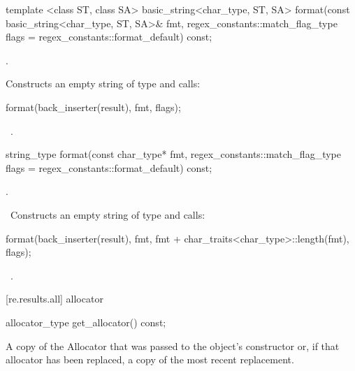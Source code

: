 %
\begin{itemdecl}
template <class ST, class SA>
  basic_string<char_type, ST, SA>
  format(const basic_string<char_type, ST, SA>& fmt,
         regex_constants::match_flag_type flags =
           regex_constants::format_default) const;
\end{itemdecl}

\begin{itemdescr}
\pnum
\requires {}.

\pnum
\effects
Constructs an empty string  of type  and
calls:
\begin{codeblock}
format(back_inserter(result), fmt, flags);
\end{codeblock}

\pnum
\returns\ .
\end{itemdescr}

%
\begin{itemdecl}
string_type
  format(const char_type* fmt,
         regex_constants::match_flag_type flags =
           regex_constants::format_default) const;
\end{itemdecl}

\begin{itemdescr}
\pnum
\requires {}.

\pnum
\effects\ Constructs an empty string  of type  and
calls:
\begin{codeblock}
format(back_inserter(result),
       fmt, fmt + char_traits<char_type>::length(fmt), flags);
\end{codeblock}

\pnum
\returns\ .
\end{itemdescr}

[re.results.all]{ allocator}%

%
\begin{itemdecl}
allocator_type get_allocator() const;
\end{itemdecl}

\begin{itemdescr}
\pnum
\returns A copy of the Allocator that was passed to the object's constructor or, if that
allocator has been replaced, a copy of the most recent replacement.
\end{itemdescr}

